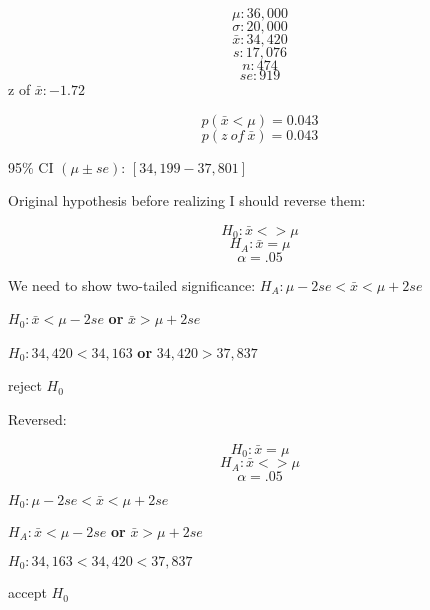 \documentclass[11pt]{article}
\begin{document}
    \[\mu: 36,000\] \[\sigma: 20,000\] \[\bar{x}: 34,420\] \[s: 17,076\]
\[n: 474\] \[se: 919\] z of \(\bar{x}: -1.72\)

\[p(\bar{x} < \mu) = 0.043\] \[p(z\ of\ \bar{x}) = 0.043\]

95\% CI \((\mu \pm se)\): \([34,199-37,801]\)

Original hypothesis before realizing I should reverse them:

\[H_0 : \bar{x} <> \mu\] \[H_A : \bar{x} = \mu\] \[\alpha = .05\]

We need to show two-tailed significance:
\(H_A : \mu-2se < \bar{x} < \mu+2se\)

\(H_0 : \bar{x} < \mu-2se\) \textbf{or} \(\bar{x} > \mu+2se\)

\(H_0 : 34,420 < 34,163\) \textbf{or} \(34,420 > 37,837\)

reject \(H_0\)

Reversed:

\[H_0 : \bar{x} = \mu\] \[H_A : \bar{x} <> \mu\] \[\alpha = .05\]

\(H_0 : \mu-2se < \bar{x} < \mu+2se\)

\(H_A : \bar{x} < \mu-2se\) \textbf{or} \(\bar{x} > \mu+2se\)

\(H_0 : 34,163 < 34,420 < 37,837\)

accept \(H_0\)

    

    
    
    
    
\end{document}
